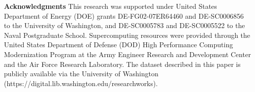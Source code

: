 {\bf Acknowledgments}
This research was supported under United States Department of Energy (DOE) grants DE-FG02-07ER64460 and DE-SC0006856 to the University of Washington, and DE-SC0005783 and DE-SC0005522 to the Naval Postgraduate School.
Supercomputing resources were provided through the United States Department of Defense (DOD) High Performance Computing Modernization Program at the Army Engineer Research and Development Center and the Air Force Research Laboratory.
The dataset described in this paper is publicly available via the University of Washington (https://digital.lib.washington.edu/researchworks).
